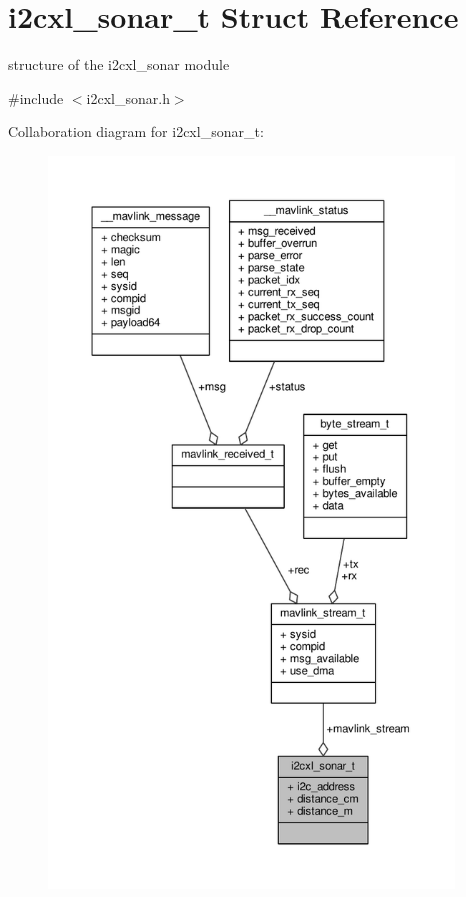 \hypertarget{structi2cxl__sonar__t}{\section{i2cxl\+\_\+sonar\+\_\+t Struct Reference}
\label{structi2cxl__sonar__t}
}


structure of the i2cxl\+\_\+sonar module  




{\ttfamily \#include $<$i2cxl\+\_\+sonar.\+h$>$}



Collaboration diagram for i2cxl\+\_\+sonar\+\_\+t\+:
\nopagebreak
\begin{figure}[H]
\begin{center}
\leavevmode
\includegraphics[height=550pt]{structi2cxl__sonar__t__coll__graph}
\end{center}
\end{figure}
